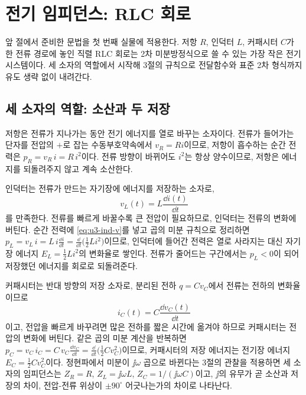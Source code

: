 \section{전기 임피던스: RLC 회로}
\label{sec:u3-electric}

앞 절에서 준비한 문법을 첫 번째 실물에 적용한다.
저항 $R$, 인덕터 $L$, 커패시터 $C$가 한 전류 경로에 놓인 직렬 RLC 회로는
2차 미분방정식으로 쓸 수 있는 가장 작은 전기 시스템이다.
세 소자의 역할에서 시작해 3절의 규칙으로 전달함수와 표준 2차 형식까지
유도 생략 없이 내려간다.

\subsection{세 소자의 역할: 소산과 두 저장}

저항은 전류가 지나가는 동안 전기 에너지를 열로 바꾸는 소자이다.
전류가 들어가는 단자를 전압의 $+$로 잡는 수동부호약속에서 $v_R = R i$이므로,
저항이 흡수하는 순간 전력은 $p_R = v_R\,i = R\,i^2$이다.
전류 방향이 바뀌어도 $i^2$는 항상 양수이므로, 저항은 에너지를 되돌려주지
않고 계속 소산한다.

인덕터는 전류가 만드는 자기장에 에너지를 저장하는 소자로,
\begin{equation}
  v_L(t) = L\frac{\dd i(t)}{\dd t}
  \label{eq:u3-ind-v}
\end{equation}
를 만족한다.
전류를 빠르게 바꿀수록 큰 전압이 필요하므로, 인덕터는 전류의 변화에 버틴다.
순간 전력에 \eqref{eq:u3-ind-v}를 넣고 곱의 미분 규칙으로 정리하면
$p_L = v_L\,i = L\,i\frac{\dd i}{\dd t}
= \frac{\dd}{\dd t}\bigl(\tfrac{1}{2}L i^2\bigr)$이므로,
인덕터에 들어간 전력은 열로 사라지는 대신 자기장 에너지
$E_L = \frac{1}{2}Li^2$의 변화율로 쌓인다.
전류가 줄어드는 구간에서는 $p_L<0$이 되어 저장했던 에너지를 회로로 되돌려준다.

커패시터는 반대 방향의 저장 소자로, 분리된 전하 $q = C v_C$에서 전류는
전하의 변화율이므로
\begin{equation}
  i_C(t) = C\frac{\dd v_C(t)}{\dd t}
  \label{eq:u3-cap-i}
\end{equation}
이고, 전압을 빠르게 바꾸려면 많은 전하를 짧은 시간에 옮겨야 하므로 커패시터는 전압의 변화에 버틴다.
같은 곱의 미분 계산을 반복하면
$p_C = v_C\,i_C = C\,v_C\frac{\dd v_C}{\dd t}
= \frac{\dd}{\dd t}\bigl(\tfrac{1}{2}C v_C^2\bigr)$이므로,
커패시터의 저장 에너지는 전기장 에너지 $E_C = \frac{1}{2}Cv_C^2$이다.
정현파에서 미분이 $\jj\omega$ 곱으로 바뀐다는 3절의 관찰을 적용하면
세 소자의 임피던스는 $Z_R = R$, $Z_L = \jj\omega L$, $Z_C = 1/(\jj\omega C)$이고,
$\jj$의 유무가 곧 소산과 저장의 차이, 전압-전류 위상이 $\pm 90^\circ$
어긋나는가의 차이로 나타난다.

